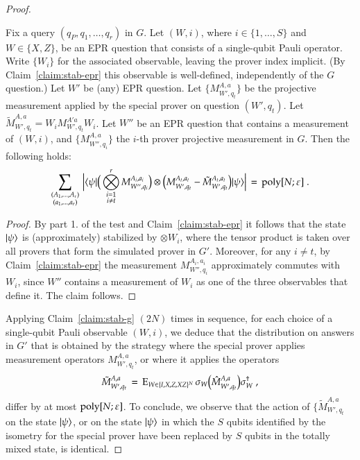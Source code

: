 \begin{proof}
\begin{claim}\label{claim:stab-g}
Fix a query $(q_P,q_1,\ldots,q_r)$ in $G$. Let $(W,i)$, where $i\in\{1,\ldots,S\}$ and $W\in\{X,Z\}$, be an EPR question that consists of a single-qubit Pauli operator. Write $\{W_i\}$ for the associated observable, leaving the prover index implicit. (By Claim~\ref{claim:stab-epr} this observable is well-defined, independently of the $G$ question.) Let $W'$ be (any) EPR question. Let $\{M_{W',q_t}^{A,a}\}$ be the projective measurement applied by the special prover on question $(W',q_t)$. Let $\tilde{M}_{W',q_t}^{A,a} = W_i M_{W',q_t}^{A'a} W_i$. Let $W''$ be an EPR question that contains a measurement of $(W,i)$, and $\{M_{W'',q_i}^{A,a}\}$ the $i$-th prover projective measurement in $G$. Then the following holds: 
\[ \sum_{\substack{(A_1,\ldots,A_r)\\(a_1,\ldots,a_r)}}\,\Big|\langle\psi|\Big( \bigotimes_{\substack{i=1\\i\neq t}}^r M_{W'',q_i}^{A_i,a_i} \Big)\otimes\Big(M_{W',q_t}^{A_t,a_t}  - \tilde{M}_{W',q_t}^{A_t,a_t}  \Big)  |\psi\rangle\Big| \,=\, \operatorname{poly}[N;\varepsilon]\;.\]

\end{claim}

\begin{proof}
By part 1. of the test and Claim~\ref{claim:stab-epr} it follows that the state $|\psi\rangle$ is (approximately) stabilized by $\otimes W_i$, where the tensor product is taken over all provers that form the simulated prover in $G'$. Moreover, for any $i\neq t$, by Claim~\ref{claim:stab-epr} the measurement $M_{W'',q_i}^{A_i,a_i}$ approximately commutes with $W_i$, since $W''$ contains a measurement of $W_i$ as one of the three observables that define it. The claim follows. 
\end{proof}

Applying Claim~\ref{claim:stab-g} $(2N)$ times in sequence, for each choice of a single-qubit Pauli observable $(W,i)$, we deduce that the distribution on answers in $G'$ that is obtained by the strategy where the special prover applies measurement operators $M_{W',q_t}^{A,a}$, or where it applies the operators
\[ \tilde{M}_{W',q_t}^{A,a} \,=\, \textsc{E}_{W\in\{I,X,Z,XZ\}^N} \, \sigma_W \big(\hat{M}_{W',q_t}^{A,a}\big) \sigma_W^\dagger \;,\]
differ by at most $\operatorname{poly}[N;\varepsilon]$. To conclude, we observe that the action of $\{\tilde{M}_{W',q_t}^{A,a}$ on the state $|\psi\rangle$, or on the state $|\psi\rangle$ in which the $S$ qubits identified by the isometry for the special prover have been replaced by $S$ qubits in the totally mixed state, is identical. 
\end{proof}